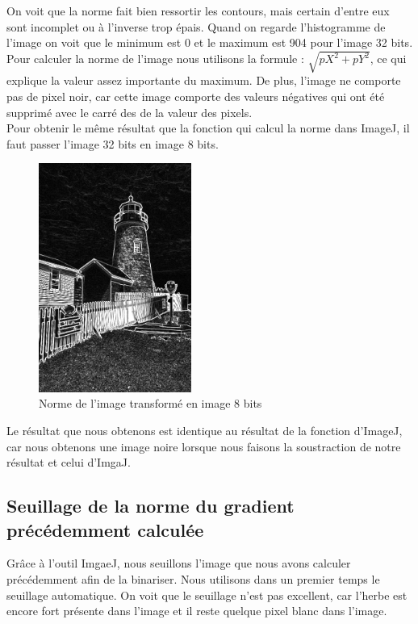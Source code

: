 \documentclass[a4paper,11pt]{article}
\begin{document}
  On voit que la norme fait bien ressortir les contours, mais certain d'entre eux sont incomplet
  ou à l'inverse trop épais. Quand on regarde l'histogramme de l'image on voit que le minimum est 0
  et le maximum est 904 pour l'image 32 bits. Pour calculer la norme de l'image nous utilisons 
  la formule : $\sqrt{pX^2 + pY^2}$, ce qui explique la valeur assez importante du maximum. De plus,
  l'image ne comporte pas de pixel noir, car cette image comporte des valeurs négatives qui ont 
  été supprimé avec le carré des de la valeur des pixels.\\
  
  Pour obtenir le même résultat que la fonction qui calcul la norme dans ImageJ, il faut passer 
  l'image 32 bits en image 8 bits.\\
  
  \begin{figure}[H]
  \center
   \includegraphics[width=5cm]{../norme8.png}
   \caption{Norme de l'image transformé en image 8 bits}
  \end{figure}
  
  Le résultat que nous obtenons est identique au résultat de la fonction d'ImageJ, car nous obtenons
  une image noire lorsque nous faisons la soustraction de notre résultat et celui d'ImgaJ.
  
  \subsection{Seuillage de la norme du gradient précédemment calculée}
  Grâce à l'outil ImgaeJ, nous seuillons l'image que nous avons calculer précédemment afin de la binariser.
  Nous utilisons dans un premier temps le seuillage automatique. On voit que le seuillage n'est pas excellent,
  car l'herbe est encore fort présente dans l'image et il reste quelque pixel blanc dans l'image.\\
  
\end{document}
